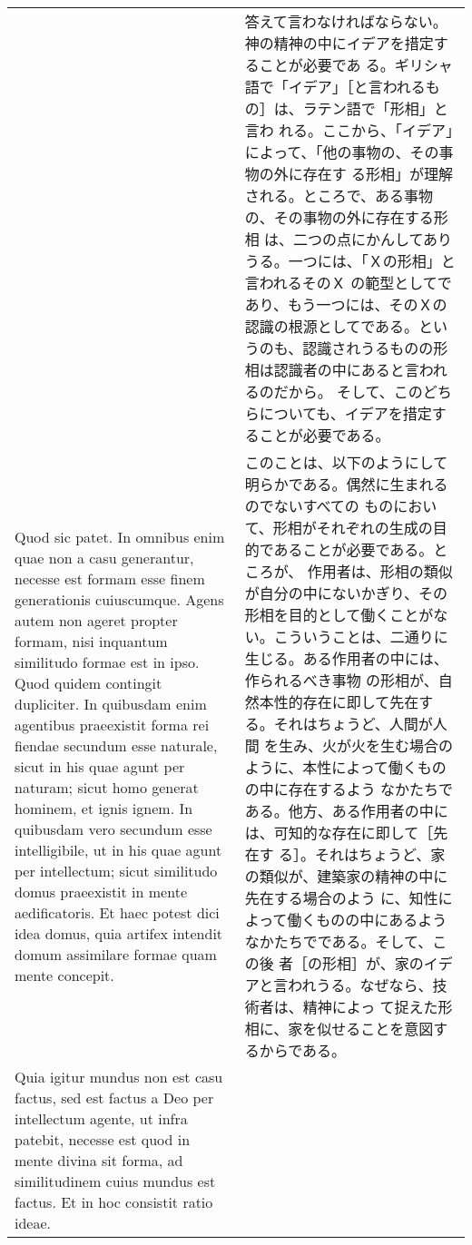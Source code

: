 \documentclass[10pt]{jsarticle} %
\begin{document}
\begin{longtable}{p{21em}p{21em}}
&

答えて言わなければならない。神の精神の中にイデアを措定することが必要であ
る。ギリシャ語で「イデア」［と言われるもの］は、ラテン語で「形相」と言わ
れる。ここから、「イデア」によって、「他の事物の、その事物の外に存在す
 る形相」が理解される。ところで、ある事物の、その事物の外に存在する形相
 は、二つの点にかんしてありうる。一つには、「Ｘの形相」と言われるそのＸ
 の範型としてであり、もう一つには、そのＸの認識の根源としてである。とい
 うのも、認識されうるものの形相は認識者の中にあると言われるのだから。
そして、このどちらについても、イデアを措定することが必要である。

\\


Quod sic patet. In omnibus enim quae non a casu generantur,
necesse est formam esse finem generationis cuiuscumque. Agens autem non
ageret propter formam, nisi inquantum similitudo formae est in
ipso. Quod quidem contingit dupliciter. In quibusdam enim agentibus
praeexistit forma rei fiendae secundum esse naturale, sicut in his quae
agunt per naturam; sicut homo generat hominem, et ignis ignem. In
quibusdam vero secundum esse intelligibile, ut in his quae agunt per
intellectum; sicut similitudo domus praeexistit in mente
aedificatoris. Et haec potest dici idea domus, quia artifex intendit
domum assimilare formae quam mente concepit. 


&

このことは、以下のようにして明らかである。偶然に生まれるのでないすべての
ものにおいて、形相がそれぞれの生成の目的であることが必要である。ところが、
作用者は、形相の類似が自分の中にないかぎり、その形相を目的として働くことがな
い。こういうことは、二通りに生じる。ある作用者の中には、作られるべき事物
の形相が、自然本性的存在に即して先在する。それはちょうど、人間が人間
を生み、火が火を生む場合のように、本性によって働くものの中に存在するよう
 なかたちである。他方、ある作用者の中には、可知的な存在に即して［先在す
 る］。それはちょうど、家の類似が、建築家の精神の中に先在する場合のよう
 に、知性によって働くものの中にあるようなかたちでである。そして、この後
 者［の形相］が、家のイデアと言われうる。なぜなら、技術者は、精神によっ
 て捉えた形相に、家を似せることを意図するからである。


\\


Quia igitur mundus non est
casu factus, sed est factus a Deo per intellectum agente, ut infra
patebit, necesse est quod in mente divina sit forma, ad similitudinem
cuius mundus est factus. Et in hoc consistit ratio ideae.


\end{longtable}
\end{document}
